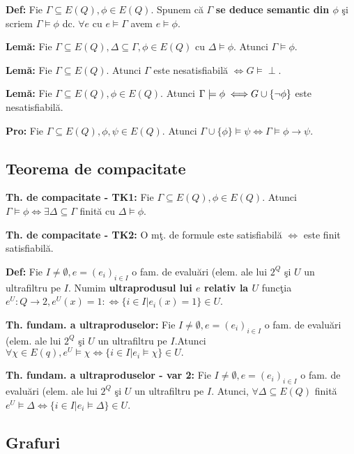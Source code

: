 \documentclass{article}
\begin{document}
\textbf{Def:} Fie $\Gamma\subseteq  E(Q),\phi\in E(Q)$. Spunem c\u a $\Gamma$ \textbf{se deduce semantic din $\phi$} \c si scriem $\Gamma\models\phi$ dc. $\forall e$ cu $e\models\Gamma$ avem $e\models\phi$.

\textbf{Lem\u a:} Fie $\Gamma\subseteq  E(Q),\Delta\subseteq\Gamma,\phi\in E(Q)$ cu $\Delta\models\phi$. Atunci $\Gamma\models \phi.$

\textbf{Lem\u a:} Fie $\Gamma\subseteq E(Q).$ Atunci $\Gamma$ este nesatisfiabil\u a $\iff G
\models\perp$.

\textbf{Lem\u a:} Fie $\Gamma\subseteq  E(Q),\phi\in E(Q)$. Atunci $\Gamma\models\phi\iff\\G
\cup\{\neg\phi\}$ este nesatisfiabil\u a.

\textbf{Pro:} Fie $\Gamma\subseteq  E(Q),\phi,\psi\in E(Q)$. Atunci $\Gamma\cup\{\phi\}\models\psi\iff\Gamma\models\phi\rightarrow\psi$.

\subsection{Teorema de compacitate}

\textbf{Th. de compacitate - TK1:} Fie $\Gamma\subseteq  E(Q),\phi\in E(Q)$. Atunci $\Gamma\models\phi\iff\exists\Delta\subseteq\Gamma$ finit\u a cu $\Delta\models\phi$.

\textbf{Th. de compacitate - TK2:} O m\c t. de formule este satisfiabil\u a $\iff$ este finit satisfiabil\u a.

\textbf{Def:} Fie $I\neq\emptyset,e=(e_i)_{i\in I}$ o fam. de evalu\u ari (elem. ale lui $2^Q$ \c si $U$ un ultrafiltru pe $I$. Numim \textbf{ultraprodusul lui $e$ relativ la $U$} func\c tia $e^U:Q\rightarrow2,e^U(x)=1:\iff\{i\in I|e_i(x)=1\}\in U$.

\textbf{Th. fundam. a ultraproduselor:} Fie $I\neq\emptyset,e=(e_i)_{i\in I}$ o fam. de evalu\u ari (elem. ale lui $2^Q$ \c si $U$ un ultrafiltru pe $I$.Atunci $\forall\chi\in E(q),e^U\models\chi\iff\{i\in I|e_i\models \chi\}\in U.$

\textbf{Th. fundam. a ultraproduselor - var 2:} Fie $I\neq\emptyset,e=(e_i)_{i\in I}$ o fam. de evalu\u ari (elem. ale lui $2^Q$ \c si $U$ un ultrafiltru pe $I$. Atunci, $\forall\Delta\subseteq E(Q)$ finit\u a $e^U\models\Delta\iff\{i\in I|e_i\models\Delta\}\in U$.

\subsection{Grafuri}
\end{document}
